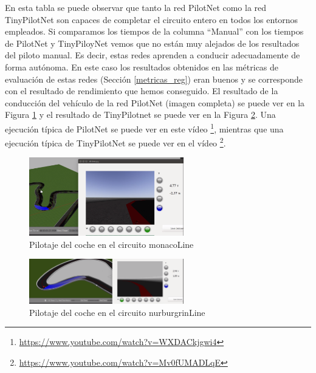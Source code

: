 En esta tabla se puede observar que tanto la red PilotNet como la red TinyPilotNet son capaces de completar el circuito entero en todos los entornos empleados. Si comparamos los tiempos de la columna ``Manual'' con los tiempos de PilotNet y TinyPiloyNet vemos que no están muy alejados de los resultados del piloto manual. Es decir, estas redes aprenden a conducir adecuadamente de forma autónoma. En este caso los resultados obtenidos en las métricas de evaluación de estas redes (Sección \ref{metricas_reg}) eran buenos y se corresponde con el resultado de rendimiento que hemos conseguido. El resultado de la conducción del vehículo de la red PilotNet (imagen completa) se puede ver en la Figura \ref{fig.monaco_reg} y el resultado de TinyPilotnet se puede ver en la Figura \ref{fig.nurburgrin_reg}. Una ejecución típica de PilotNet se puede ver en este vídeo  \footnote{\url{https://www.youtube.com/watch?v=WXDACkjgwi4}}, mientras que una ejecución típica de TinyPilotNet se puede ver en el vídeo \footnote{\url{https://www.youtube.com/watch?v=Mv0fUMADLqE}}.\\

\begin{figure}
\begin{center}
	\includegraphics[width=0.6\textwidth]{figures/Regresion/monaco_reg.png}
   \caption{Pilotaje del coche en el circuito monacoLine}
	\label{fig.monaco_reg}
\end{center}
\end{figure}

\begin{figure}
\begin{center}
	\includegraphics[width=0.6\textwidth]{figures/Regresion/tinypilotnet_completa.png}
   \caption{Pilotaje del coche en el circuito nurburgrinLine}
	\label{fig.nurburgrin_reg}
\end{center}
\end{figure}



